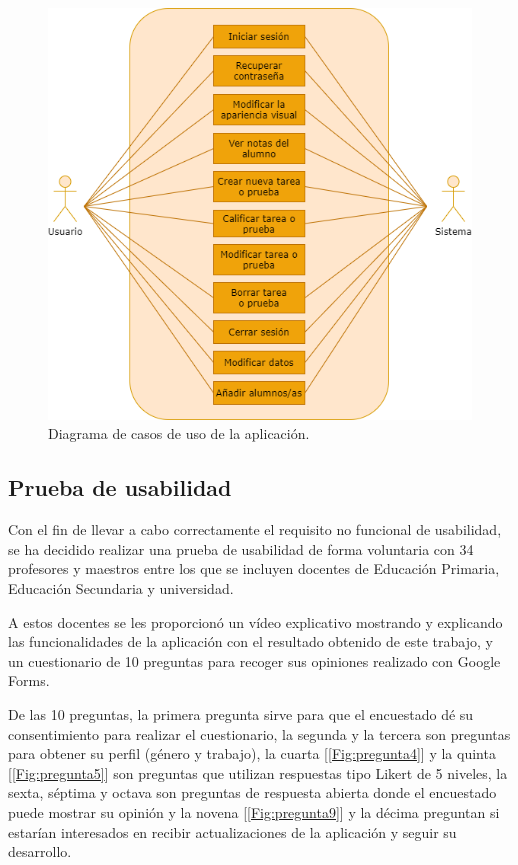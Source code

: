 \begin{figure}[h]
\centering\includegraphics[width=1\linewidth]{figs/diagramacdu.png}
\caption{Diagrama de casos de uso de la aplicación.}
\label{Fig:diagramacdu}
\end{figure}


\subsection{Prueba de usabilidad}
\label{sub:pruebausabilidad}
Con el fin de llevar a cabo correctamente el requisito no funcional de usabilidad, se ha decidido realizar una prueba de usabilidad de forma voluntaria con 34 profesores y maestros entre los que se incluyen docentes de Educación Primaria, Educación Secundaria y universidad.

A estos docentes se les proporcionó un vídeo explicativo mostrando y explicando las funcionalidades de la aplicación con el resultado obtenido de este trabajo, y un cuestionario de 10 preguntas para recoger sus opiniones realizado con Google Forms.

De las 10 preguntas, la primera pregunta sirve para que el encuestado dé su consentimiento para realizar el cuestionario, la segunda y la tercera son preguntas para obtener su perfil (género y trabajo), la cuarta [\ref{Fig:pregunta4}] y la quinta [\ref{Fig:pregunta5}] son preguntas que utilizan respuestas tipo Likert de 5 niveles, la sexta, séptima y octava son preguntas de respuesta abierta donde el encuestado puede mostrar su opinión y la novena [\ref{Fig:pregunta9}] y la décima preguntan si estarían interesados en recibir actualizaciones de la aplicación y seguir su desarrollo.

